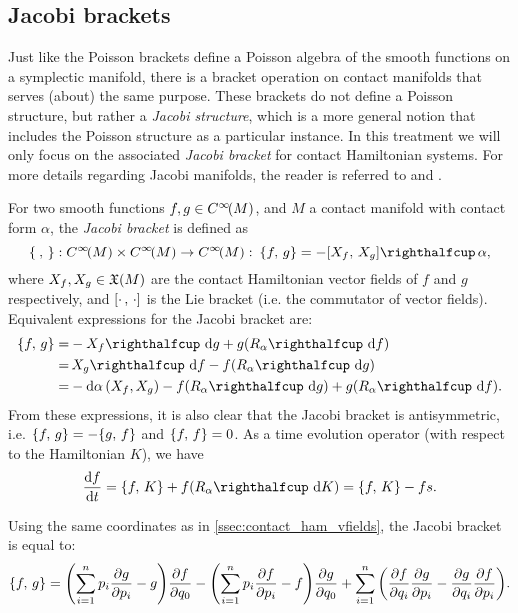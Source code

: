 \subsection{Jacobi brackets}
Just like the Poisson brackets define a Poisson algebra of the smooth functions on a symplectic manifold, there is a bracket operation on contact manifolds that serves (about) the same purpose. These brackets do not define a Poisson structure, but rather a \emph{Jacobi structure}, which is a more general notion that includes the Poisson structure as a particular instance. In this treatment we will only focus on the associated \emph{Jacobi bracket} for contact Hamiltonian systems. For more details regarding Jacobi manifolds, the reader is referred to \cite[chap. V]{Libermann1987} and \cite{DeLeon2020}.

For two smooth functions $f, g \in C^\infty\!\qty(M)$, and $M$ a contact manifold with contact form $\alpha$, the \emph{Jacobi bracket} is defined as
\begin{equation}
    \jacobi{\:}{}: \functions{M} \times \functions{M} \to \functions{M}:\: \jacobi{f}{g} = -\intpr{\liebr{X_f}{X_g}}{\alpha},
\end{equation}
where $X_f, X_g \in \mathfrak{X}\qty(M)$ are the contact Hamiltonian vector fields of $f$ and $g$ respectively, and $\qty[\cdot\,,\,\cdot]$ is the Lie bracket (i.e. the commutator of vector fields). Equivalent expressions for the Jacobi bracket are: \cite{Libermann1987}
\begin{equation}
    \begin{split}
        \jacobi{f}{g} =& -\intpr{X_f}{\dd{g}} + g(\intpr{R_\alpha}{\dd{f}}) \\
                      =& \, \intpr{X_g}{\dd{f}} - f(\intpr{R_\alpha}{\dd{g}}) \\
                      =& -\dd{\alpha}(X_f, X_g) - f(\intpr{R_\alpha}{\dd{g}}) + g(\intpr{R_\alpha}{\dd{f}}).\\
    \end{split}
\end{equation}
From these expressions, it is also clear that the Jacobi bracket is antisymmetric, i.e. $\{f,\,g\} = - \{g,\,f\}$ and $\{f,\,f\} = 0$. As a time evolution operator (with respect to the Hamiltonian $K$), we have
$$ \dv{f}{t} = \jacobi{f}{K} + f(\intpr{R_\alpha}{\dd{K}}) = \jacobi{f}{K} - fs. $$

Using the same coordinates as in \cref{ssec:contact_ham_vfields}, the Jacobi bracket is equal to:
$$ 
    \{f,\,g\} = \qty(\sum_{i=1}^n p_i \pdv{g}{p_i} - g)\pdv{f}{q_0} - \qty(\sum_{i=1}^n p_i \pdv{f}{p_i} - f)\pdv{g}{q_0} 
    + \sum_{i=1}^n\qty(\pdv{f}{q_i}\pdv{g}{p_i} - \pdv{g}{q_i}\pdv{f}{p_i}).
$$

